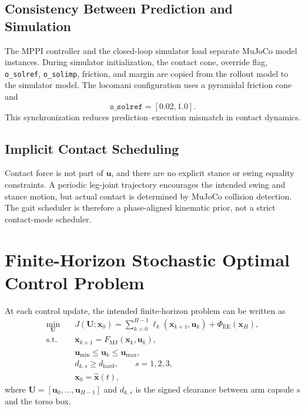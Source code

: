 \documentclass[11pt,a4paper]{article}
\newcommand{\code}[1]{\texttt{#1}}
\begin{document}
\subsection{Consistency Between Prediction and Simulation}

The MPPI controller and the closed-loop simulator load separate MuJoCo model
instances. During simulator initialization, the contact cone, override flag,
\code{o\_solref}, \code{o\_solimp}, friction, and margin are copied from the
rollout model to the simulator model. The locomani configuration uses a
pyramidal friction cone and
\begin{equation}
  \code{o\_solref}=[0.02,1.0].
\end{equation}
This synchronization reduces prediction--execution mismatch in contact
dynamics.

\subsection{Implicit Contact Scheduling}

Contact force is not part of $\bm{u}$, and there are no explicit stance or
swing equality constraints. A periodic leg-joint trajectory encourages the
intended swing and stance motion, but actual contact is determined by MuJoCo
collision detection. The gait scheduler is therefore a phase-aligned
kinematic prior, not a strict contact-mode scheduler.

\section{Finite-Horizon Stochastic Optimal Control Problem}

At each control update, the intended finite-horizon problem can be written as
\begin{equation}
\boxed{
\begin{aligned}
\min_{\bm{U}}\quad
  &J(\bm{U};\bm{x}_0)
  =\sum_{k=0}^{H-1}\ell_k(\bm{x}_{k+1},\bm{u}_k)
   +\Phi_{\mathrm{EE}}(\bm{x}_H),\\
\mathrm{s.t.}\quad
  &\bm{x}_{k+1}=F_{\mathrm{MJ}}(\bm{x}_k,\bm{u}_k),\\
  &\bm{u}_{\min}\leq\bm{u}_k\leq\bm{u}_{\max},\\
  &d_{k,s}\geq d_{\mathrm{hard}},\qquad s=1,2,3,\\
  &\bm{x}_0=\hat{\bm{x}}(t),
\end{aligned}}
\label{eq:finite_ocp}
\end{equation}
where $\bm{U}=[\bm{u}_0,\ldots,\bm{u}_{H-1}]$ and $d_{k,s}$ is the signed
clearance between arm capsule $s$ and the torso box.
\end{document}
